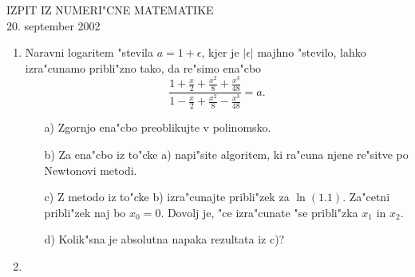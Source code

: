 
\begin{center}
  IZPIT IZ NUMERI"CNE MATEMATIKE\\
  20. september 2002
\end{center}

\begin{enumerate}

  \item Naravni logaritem "stevila $a=1+\epsilon$, kjer je $|\epsilon|$
    majhno "stevilo, lahko izra"cunamo pribli"zno tako, da
    re"simo ena"cbo
    $$\frac{1+\frac{x}{2}+\frac{x^2}{8}+\frac{x^3}{48}}
      {1-\frac{x}{2}+\frac{x^2}{8}-\frac{x^3}{48}}=a.
    $$
    \begin{itemize}
      \item[a)] Zgornjo ena"cbo preoblikujte v polinomsko.
      \item[b)] Za ena"cbo iz to"cke a) napi"site algoritem, ki
        ra"cuna njene re"sitve po Newtonovi metodi.
      \item[c)] Z metodo iz to"cke b) izra"cunajte pribli"zek
	za $\ln(1.1)$. Za"cetni pribli"zek naj bo $x_0=0$.
        Dovolj je, "ce izra"cunate "se pribli"zka $x_1$ in $x_2$.
      \item[d)] Kolik"sna je absolutna napaka rezultata iz c)?
    \end{itemize}
  \item  
\end{enumerate}


